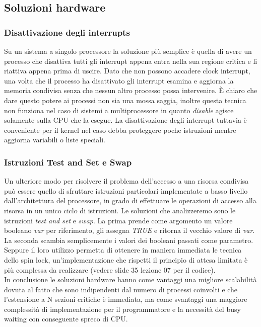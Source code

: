 \subsection{Soluzioni hardware}
\subsubsection{Disattivazione degli interrupts}
Su un sistema a singolo processore la soluzione più semplice è quella di avere un processo che disattiva tutti gli interrupt appena entra nella sua regione critica e li riattiva appena
prima di uscire. Dato che non possono accadere clock interrupt, una volta che il processo ha disattivato gli interrupt esamina e aggiorna la memoria condivisa senza che nessun altro
processo possa intervenire. È chiaro che dare questo potere ai processi non sia una mossa saggia, inoltre questa tecnica non funziona nel caso di sistemi a multiprocessore in quanto
\emph{disable} agisce solamente sulla CPU che la esegue. La disattivazione degli interrupt tuttavia è conveniente per il kernel nel caso debba proteggere poche istruzioni mentre aggiorna variabili o liste speciali.
\subsubsection{Istruzioni Test and Set e Swap}
Un ulteriore modo per risolvere il problema dell'accesso a una risorsa condivisa può essere quello di sfruttare istruzioni particolari implementate a basso livello dall'architettura del processore, in grado di effettuare le operazioni di accesso alla risorsa in un unico ciclo di istruzioni.
Le soluzioni che analizzeremo sono le istruzioni \emph{test and set} e \emph{swap}.
La prima prende come argomento un valore booleano \emph{var} per riferimento, gli assegna \emph{TRUE} e ritorna il vecchio valore di \emph{var}.
La seconda scambia semplicemente i valori dei booleani passati come parametro.
Seppure il loro utilizzo permetta di ottenere in maniera immediata le tecnica dello spin lock, un'implementazione che rispetti il principio di attesa limitata è più complessa da realizzare (vedere slide 35 lezione 07 per il codice). \\
In conclusione le soluzioni hardware hanno come vantaggi una migliore scalabilità dovuta al fatto che sono indipendenti dal numero di processi coinvolti e che l'estensione a N sezioni critiche è immediata, ma come svantaggi una maggiore complessità di implementazione per il programmatore e la necessità del busy waiting con conseguente spreco di CPU.


